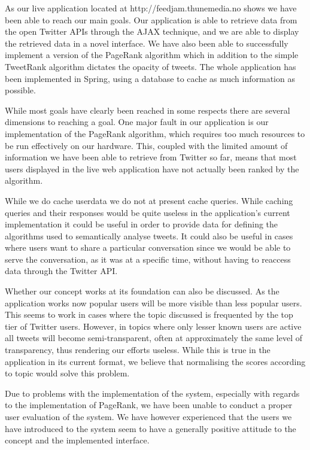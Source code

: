 As our live application located at http://feedjam.thunemedia.no shows we have been able to reach our main goals. Our application is able to retrieve data from the open Twitter APIs through the AJAX technique, and we are able to display the retrieved data in a novel interface. We have also been able to successfully implement a version of the PageRank algorithm which in addition to the simple TweetRank algorithm dictates the opacity of tweets. The whole application has been implemented in Spring, using a database to cache as much information as possible.

While most goals have clearly been reached in some respects there are several dimensions to reaching a goal. One major fault in our application is our implementation of the PageRank algorithm, which requires too much resources to be run effectively on our hardware. This, coupled with the limited amount of information we have been able to retrieve from Twitter so far, means that most users displayed in the live web application have not actually been ranked by the algorithm.

While we do cache userdata we do not at present cache queries. While caching queries and their responses would be quite useless in the application's current implementation it could be useful in order to provide data for defining the algorithms used to semantically analyse tweets. It could also be useful in cases where users want to share a particular conversation since we would be able to serve the conversation, as it was at a specific time, without having to reaccess data through the Twitter API.

Whether our concept works at its foundation can also be discussed. As the application works now popular users will be more visible than less popular users. This seems to work in cases where the topic discussed is frequented by the top tier of Twitter users. However, in topics where only lesser known users are active all tweets will become semi-transparent, often at approximately the same level of transparency, thus rendering our efforts useless. While this is true in the application in its current format, we believe that normalising the scores according to topic would solve this problem.

Due to problems with the implementation of the system, especially with regards to the implementation of PageRank, we have been unable to conduct a proper user evaluation of the system. We have however experienced that the users we have introduced to the system seem to have a generally positive attitude to the concept and the implemented interface.